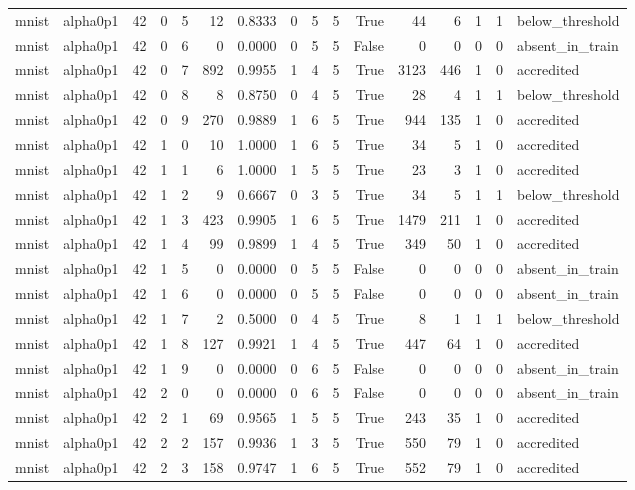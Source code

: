 \begin{tabular}{llrrrrrrrrrrrrrl}
mnist & alpha0p1 & 42 & 0 & 5 & 12 & 0.8333 & 0 & 5 & 5 & True & 44 & 6 & 1 & 1 & below\_threshold \\
mnist & alpha0p1 & 42 & 0 & 6 & 0 & 0.0000 & 0 & 5 & 5 & False & 0 & 0 & 0 & 0 & absent\_in\_train \\
mnist & alpha0p1 & 42 & 0 & 7 & 892 & 0.9955 & 1 & 4 & 5 & True & 3123 & 446 & 1 & 0 & accredited \\
mnist & alpha0p1 & 42 & 0 & 8 & 8 & 0.8750 & 0 & 4 & 5 & True & 28 & 4 & 1 & 1 & below\_threshold \\
mnist & alpha0p1 & 42 & 0 & 9 & 270 & 0.9889 & 1 & 6 & 5 & True & 944 & 135 & 1 & 0 & accredited \\
mnist & alpha0p1 & 42 & 1 & 0 & 10 & 1.0000 & 1 & 6 & 5 & True & 34 & 5 & 1 & 0 & accredited \\
mnist & alpha0p1 & 42 & 1 & 1 & 6 & 1.0000 & 1 & 5 & 5 & True & 23 & 3 & 1 & 0 & accredited \\
mnist & alpha0p1 & 42 & 1 & 2 & 9 & 0.6667 & 0 & 3 & 5 & True & 34 & 5 & 1 & 1 & below\_threshold \\
mnist & alpha0p1 & 42 & 1 & 3 & 423 & 0.9905 & 1 & 6 & 5 & True & 1479 & 211 & 1 & 0 & accredited \\
mnist & alpha0p1 & 42 & 1 & 4 & 99 & 0.9899 & 1 & 4 & 5 & True & 349 & 50 & 1 & 0 & accredited \\
mnist & alpha0p1 & 42 & 1 & 5 & 0 & 0.0000 & 0 & 5 & 5 & False & 0 & 0 & 0 & 0 & absent\_in\_train \\
mnist & alpha0p1 & 42 & 1 & 6 & 0 & 0.0000 & 0 & 5 & 5 & False & 0 & 0 & 0 & 0 & absent\_in\_train \\
mnist & alpha0p1 & 42 & 1 & 7 & 2 & 0.5000 & 0 & 4 & 5 & True & 8 & 1 & 1 & 1 & below\_threshold \\
mnist & alpha0p1 & 42 & 1 & 8 & 127 & 0.9921 & 1 & 4 & 5 & True & 447 & 64 & 1 & 0 & accredited \\
mnist & alpha0p1 & 42 & 1 & 9 & 0 & 0.0000 & 0 & 6 & 5 & False & 0 & 0 & 0 & 0 & absent\_in\_train \\
mnist & alpha0p1 & 42 & 2 & 0 & 0 & 0.0000 & 0 & 6 & 5 & False & 0 & 0 & 0 & 0 & absent\_in\_train \\
mnist & alpha0p1 & 42 & 2 & 1 & 69 & 0.9565 & 1 & 5 & 5 & True & 243 & 35 & 1 & 0 & accredited \\
mnist & alpha0p1 & 42 & 2 & 2 & 157 & 0.9936 & 1 & 3 & 5 & True & 550 & 79 & 1 & 0 & accredited \\
mnist & alpha0p1 & 42 & 2 & 3 & 158 & 0.9747 & 1 & 6 & 5 & True & 552 & 79 & 1 & 0 & accredited \\

\end{tabular}
